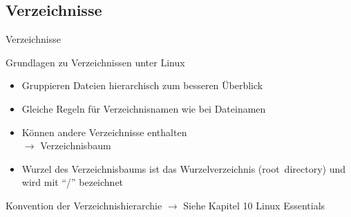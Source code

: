 \documentclass[aspectratio=43]{beamer}
\begin{document}
\subsection{Verzeichnisse}
\begin{frame}{Verzeichnisse}
  \begin{block}{Grundlagen zu Verzeichnissen unter Linux}
  \begin{itemize}
    \item Gruppieren Dateien hierarchisch zum besseren Überblick
    \item Gleiche Regeln für Verzeichnisnamen wie bei Dateinamen
    \item Können andere Verzeichnisse enthalten \\
      $\rightarrow$ Verzeichnisbaum
    \item Wurzel des Verzeichnisbaums ist das Wurzelverzeichnis (root~directory)
          und wird mit ``/'' bezeichnet
  \end{itemize}
  \end{block}
  \begin{block}{Konvention der Verzeichnishierarchie}
    $\rightarrow$ Siehe Kapitel 10 Linux Essentials
  \end{block}

\end{frame}
\end{document}
